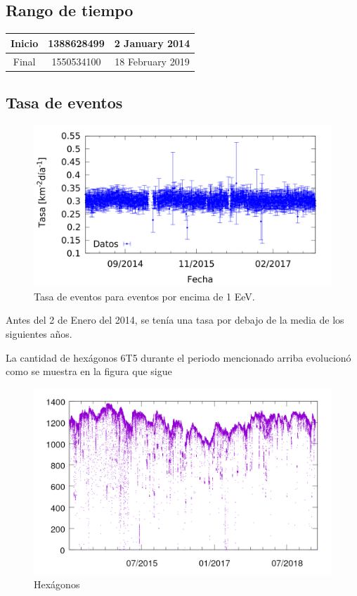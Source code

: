 

\subsection{Rango de tiempo}
\begin{table}[H]
\centering
\begin{tabular}{c|c|c}
Inicio & 1388628499 & 2 January 2014 \\ \hline
Final  & 1550534100 & 18 February 2019 \\
\end{tabular}
\end{table}

\subsection{Tasa de eventos}

\begin{figure}[H]
	\centering
	\includegraphics[width=\linewidth]{rate_1_EeV.png}
	\caption{Tasa de eventos para eventos por encima de 1 EeV.}
\end{figure}

Antes del 2 de Enero del 2014, se tenía una tasa por debajo de la media de los siguientes años.

La cantidad de hexágonos 6T5 durante el periodo mencionado arriba evolucionó como se muestra  en la figura que sigue


\begin{figure}[H]
	\centering
	\includegraphics[width=\linewidth]{hex_rango_corto.png}
	\caption{Hexágonos}
\end{figure}


